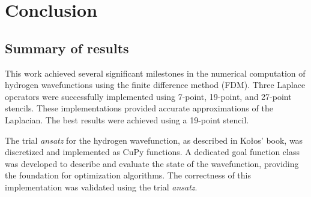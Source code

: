 \section{Conclusion}

\subsection{Summary of results}

%
%
%
%
%
%
%
%
%
%
%
%

This work achieved several significant milestones in the numerical computation of hydrogen wavefunctions using the finite difference method (FDM). Three Laplace operators were successfully implemented using 7-point, 19-point, and 27-point stencils. These implementations provided accurate approximations of the Laplacian. The best results were achieved using a 19-point stencil.

The trial \textit{ansatz} for the hydrogen wavefunction, as described in Kołos' book, was discretized and implemented as CuPy functions. A dedicated goal function class was developed to describe and evaluate the state of the wavefunction, providing the foundation for optimization algorithms. The correctness of this implementation was validated using the trial \textit{ansatz}.

